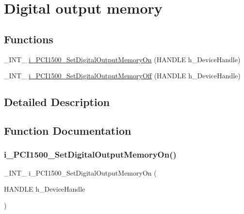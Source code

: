 \hypertarget{group___dig_out_memory}{}\section{Digital output memory}
\label{group___dig_out_memory}
\subsection*{Functions}
\begin{DoxyCompactItemize}
\item 
\+\_\+\+I\+N\+T\+\_\+ \mbox{\hyperlink{group___dig_out_memory_ga0bb1f9792ea013420ae616f9e223e1e5}{i\+\_\+\+P\+C\+I1500\+\_\+\+Set\+Digital\+Output\+Memory\+On}} (H\+A\+N\+D\+LE h\+\_\+\+Device\+Handle)
\item 
\+\_\+\+I\+N\+T\+\_\+ \mbox{\hyperlink{group___dig_out_memory_ga46554567f47286eb28382a0d77cfbc23}{i\+\_\+\+P\+C\+I1500\+\_\+\+Set\+Digital\+Output\+Memory\+Off}} (H\+A\+N\+D\+LE h\+\_\+\+Device\+Handle)
\end{DoxyCompactItemize}


\subsection{Detailed Description}


\subsection{Function Documentation}
\mbox{\label{group___dig_out_memory_ga0bb1f9792ea013420ae616f9e223e1e5}} 
\subsubsection{\texorpdfstring{i\_PCI1500\_SetDigitalOutputMemoryOn()}{i\_PCI1500\_SetDigitalOutputMemoryOn()}}
{\footnotesize\ttfamily \+\_\+\+I\+N\+T\+\_\+ i\+\_\+\+P\+C\+I1500\+\_\+\+Set\+Digital\+Output\+Memory\+On (\begin{DoxyParamCaption}\item[{H\+A\+N\+D\+LE}]{h\+\_\+\+Device\+Handle }\end{DoxyParamCaption})}

